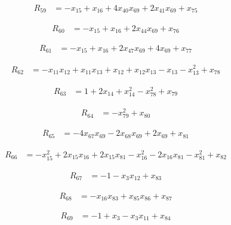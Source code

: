 \begin{align*}
R_{59} &= -x_{15} +x_{16} +4 x_{40} x_{69} +2 x_{41} x_{69} +x_{75}
\end{align*}

\begin{align*}
R_{60} &= -x_{15} +x_{16} +2 x_{44} x_{69} +x_{76}
\end{align*}

\begin{align*}
R_{61} &= -x_{15} +x_{16} +2 x_{47} x_{69} +4 x_{69} +x_{77}
\end{align*}

\begin{align*}
R_{62} &= -x_{11} x_{12} +x_{11} x_{13} +x_{12} +x_{12} x_{13} -x_{13} -x_{13}^{2} +x_{78}
\end{align*}

\begin{align*}
R_{63} &= 1 +2 x_{14} +x_{14}^{2} -x_{78}^{2} +x_{79}
\end{align*}

\begin{align*}
R_{64} &= -x_{79}^{2} +x_{80}
\end{align*}

\begin{align*}
R_{65} &= -4 x_{67} x_{69} -2 x_{68} x_{69} +2 x_{69} +x_{81}
\end{align*}

\begin{align*}
R_{66} &= -x_{15}^{2} +2 x_{15} x_{16} +2 x_{15} x_{81} -x_{16}^{2} -2 x_{16} x_{81} -x_{81}^{2} +x_{82}
\end{align*}

\begin{align*}
R_{67} &= -1 -x_{3} x_{12} +x_{83}
\end{align*}

\begin{align*}
R_{68} &= -x_{16} x_{83} +x_{85} x_{86} +x_{87}
\end{align*}

\begin{align*}
R_{69} &= -1 +x_{3} -x_{3} x_{11} +x_{84}
\end{align*}

